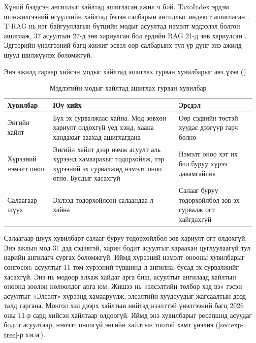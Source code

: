 Хүний бэлдсэн ангиллыг хайлтад ашигласан ажил ч бий. TaxoIndex эрдэм шинжилгээний өгүүллийн хайлтад бэлэн салбарын ангиллыг индекст ашигласан \cite{kang2024taxoindex}. T-RAG нь нэг байгууллагын бүтцийн модыг асуултад нэмэлт мэдээлэл болгон ашиглаж, 37 асуултын 27-д зөв хариулсан бол ердийн RAG 21-д зөв хариулсан \cite{fatehkia2024trag}. Эдгээрийн үнэлгээний багц жижиг эсвэл өөр салбарынх тул үр дүнг энэ ажилд шууд шилжүүлэх боломжгүй.

Энэ ажилд гараар хийсэн модыг хайлтад ашиглах гурван хувилбарыг авч үзэв ().

\begin{table}[H]
\centering
\caption{Мэдлэгийн модыг хайлтад ашиглах гурван хувилбар}
\label{tab:tree_options}
\begin{tabular}{|p{2.6cm}|p{5.7cm}|p{5.3cm}|}
\hline
\textbf{Хувилбар} & \textbf{Юу хийх} & \textbf{Эрсдэл} \\
\hline
Энгийн хайлт & Бүх эх сурвалжаас хайна. Мод зөвхөн хариулт олдохгүй үед хэнд, хаана хандахыг заахад ашиглагдана & Өөр сэдвийн төстэй хуудас дээгүүр гарч болно \\
\hline
Хүрээний нэмэлт оноо & Энгийн хайлт дээр нэмж асуулт аль хүрээнд хамаарахыг тодорхойлж, тэр хүрээний эх сурвалжид нэмэлт оноо өгнө. Бусдыг хасахгүй & Нэмэлт оноо хэт их бол буруу хүрээ давамгайлна \\
\hline
Салаагаар шүүх & Эхлээд тодорхойлсон салаандаа л хайна & Салааг буруу тодорхойлбол зөв эх сурвалж огт хайгдахгүй \\
\hline
\end{tabular}
\end{table}

Салаагаар шүүх хувилбарт салааг буруу тодорхойлбол зөв хариулт огт олдохгүй. Энэ ажлын мод 31 дэд сэдэвтэй, харин бодит асуултыг хараахан цуглуулаагүй тул нарийн ангилагч сургах боломжгүй. Иймд хүрээний нэмэлт онооны хувилбарыг сонгосон: асуултыг 11 том хүрээний түвшинд л ангилна, бусад эх сурвалжийг хасахгүй. Энэ нь модоор алхаж хайдаг арга биш, асуултыг ангилаад хайлтын оноонд зөөлөн нөлөөлдөг арга юм. Жишээ нь «элсэлтийн төлбөр хэд вэ» гэсэн асуултыг «Элсэлт» хүрээнд хамааруулж, элсэлтийн хуудсуудыг жагсаалтын дээд талд гаргана. Монгол хэл дээрх хайлтын нийтэд нээлттэй үнэлгээний багц 2026 оны 11-р сард хийсэн хайлтаар олдоогүй. Иймд энэ хувилбарыг ресепшнд асуудаг бодит асуултаар, нэмэлт оноогүй энгийн хайлтын тоотой хамт үнэлнэ (\ref{sec:exp-tree}-р хэсэг).
